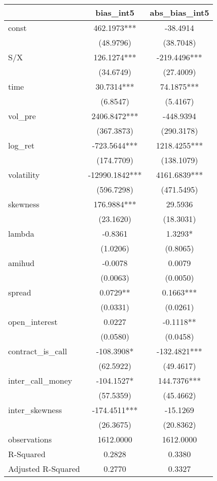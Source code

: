\begin{tabular}{lcc}
\hline
                   &   bias\_int5   & abs\_bias\_int5  \\
\midrule
\midrule
const              & 462.1973***    & -38.4914         \\
                   & (48.9796)      & (38.7048)        \\
S/X                & 126.1274***    & -219.4496***     \\
                   & (34.6749)      & (27.4009)        \\
time               & 30.7314***     & 74.1875***       \\
                   & (6.8547)       & (5.4167)         \\
vol\_pre           & 2406.8472***   & -448.9394        \\
                   & (367.3873)     & (290.3178)       \\
log\_ret           & -723.5644***   & 1218.4255***     \\
                   & (174.7709)     & (138.1079)       \\
volatility         & -12990.1842*** & 4161.6839***     \\
                   & (596.7298)     & (471.5495)       \\
skewness           & 176.9884***    & 29.5936          \\
                   & (23.1620)      & (18.3031)        \\
lambda             & -0.8361        & 1.3293*          \\
                   & (1.0206)       & (0.8065)         \\
amihud             & -0.0078        & 0.0079           \\
                   & (0.0063)       & (0.0050)         \\
spread             & 0.0729**       & 0.1663***        \\
                   & (0.0331)       & (0.0261)         \\
open\_interest     & 0.0227         & -0.1118**        \\
                   & (0.0580)       & (0.0458)         \\
contract\_is\_call & -108.3908*     & -132.4821***     \\
                   & (62.5922)      & (49.4617)        \\
inter\_call\_money & -104.1527*     & 144.7376***      \\
                   & (57.5359)      & (45.4662)        \\
inter\_skewness    & -174.4511***   & -15.1269         \\
                   & (26.3675)      & (20.8362)        \\
observations       & 1612.0000      & 1612.0000        \\
R-Squared          & 0.2828         & 0.3380           \\
Adjusted R-Squared & 0.2770         & 0.3327           \\
\hline
\end{tabular}